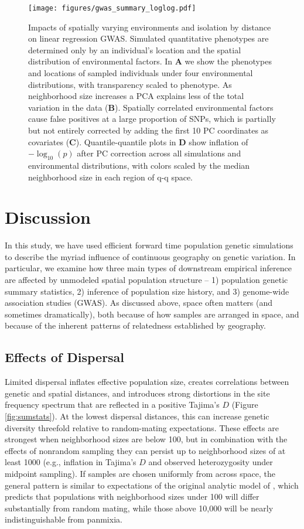 \documentclass[10pt,twoside,lineno,hidelinks]{preprint}
\begin{document}
\begin{figure}[p]
\centering
\texttt{[image: figures/gwas\_summary\_loglog.pdf]}
    \caption{Impacts of spatially varying environments and isolation by distance on linear regression GWAS. Simulated quantitative phenotypes are determined only by an individual's location and the spatial distribution of environmental factors. In \textbf{A} we show the phenotypes and locations of sampled individuals under four environmental distributions, with transparency scaled to phenotype. As neighborhood size increases a PCA explains less of the total variation in the data (\textbf{B}). Spatially correlated environmental factors cause false positives at a large proportion of SNPs, which is partially but not entirely corrected by adding the first 10 PC coordinates as covariates (\textbf{C}). Quantile-quantile plots in \textbf{D} show inflation of $-\log_{10}(p)$ after PC correction across all simulations and environmental distributions, with colors scaled by the median neighborhood size in each region of q-q space.
}
\label{fig:gwas}
\end{figure}

\section{Discussion}

In this study,
we have used efficient forward time population genetic simulations 
to describe the myriad influence of continuous geography on genetic variation. 
In particular, we examine how three main types of downstream empirical inference are affected by unmodeled spatial population structure
-- 1) population genetic summary statistics, 2) inference of population size history, and 3) genome-wide association studies (GWAS). 
As discussed above, 
space often matters (and sometimes dramatically),
both because of how samples are arranged in space, and because of the inherent patterns of relatedness established by geography.


\subsection{Effects of Dispersal}

Limited dispersal inflates effective population size, creates correlations between genetic and spatial distances, 
and introduces strong distortions in the site frequency spectrum that are reflected in a positive Tajima's $D$ (Figure \ref{fig:sumstats}). 
At the lowest dispersal distances, this can increase genetic diversity threefold relative to random-mating expectations. 
These effects are strongest when neighborhood sizes are below 100, but in combination with the effects of nonrandom sampling they can persist up to neighborhood sizes of at least 1000 (e.g., inflation in Tajima's $D$ and observed heterozygosity under midpoint sampling). 
If samples are chosen uniformly from across space, 
the general pattern is similar to expectations of the original analytic model of \citet{Wright1943}, which predicts that populations with neighborhood sizes under 100 will differ substantially from random mating, 
while those above 10,000 will be nearly indistinguishable from panmixia. 
\end{document}
